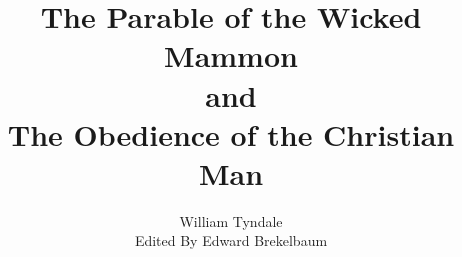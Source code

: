 \documentclass{custom}
\begin{document}
\title{\textbf{The Parable of the Wicked Mammon\\
and\\
The Obedience of the Christian Man}}

\author{William Tyndale\\
Edited By Edward Brekelbaum}
\date{}
\maketitle
\tableofcontents


\end{document}
